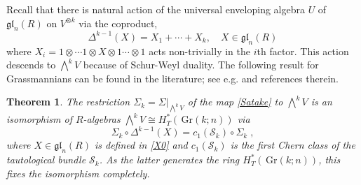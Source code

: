 \documentclass[12pt]{amsart}
\newcommand{\cS}{\mathcal{S}}
\newcommand{\Gr}{\,\mathrm{Gr}}
\newcommand{\ring}{R}
\newtheorem{thm}{Theorem}[section]
\numberwithin{equation}{section}
\numberwithin{figure}{section}
\newcommand{\gl}{\mathfrak{gl}}
\begin{document}
Recall that there is natural action of the universal enveloping algebra $U$ of $\gl_n(\ring)$ on $V^{\otimes k}$ via the coproduct,
\[
\Delta^{k-1}(X)=X_1+\cdots +X_k,\quad X\in\gl_n(\ring)
\]
where $X_i=1\otimes\cdots1\otimes X\otimes1\cdots \otimes1$ acts non-trivially in the $i$th factor. This action descends to $\bigwedge^kV$ because of Schur-Weyl duality. The following result for Grassmannians can be found in the literature; see e.g. \cite{anderson2023equivariant,labelle2024equivariant} and references therein.
\begin{thm}
    The restriction $\Sigma_k=\Sigma|_{\bigwedge^kV}$ of the map \eqref{Satake} to $\bigwedge^kV$ is an isomorphism of $\ring$-algebras $\bigwedge^kV\cong H^*_T(\Gr(k;n))$ via
    \[
    \Sigma_k\circ \Delta^{k-1}(X)=c_1(\cS_k)\circ\Sigma_k\;,
    \]
    where $X\in\gl_n(\ring)$ is defined in \eqref{X0} and $c_1(\cS_k)$ is the first Chern class of the tautological bundle $\cS_k$. As the latter generates the ring $H^*_T(\Gr(k;n))$, this fixes the isomorphism completely.
\end{thm}
\end{document}
